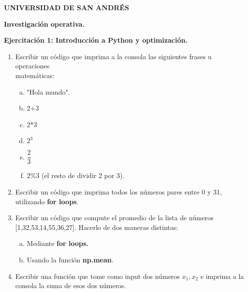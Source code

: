 \documentclass[12pt]{article}
\begin{document}
    \begin{center}
        {\bf UNIVERSIDAD DE SAN ANDR\'ES}
        \medskip
        
        {\bf Investigación operativa.}
        \medskip
        
        {\bf Ejercitaci\'on 1: Introducción a Python y optimización.}
        \medskip


        \begin{enumerate}
            \item Escribir un código que imprima a la consola las siguientes frases u operaciones \\
            matemáticas:
            \begin{enumerate}[a)]
                \item "Hola mundo".
                \item 2+3
                \item 2*3
                \item $2^{3}$
                \item $\dfrac{2}{3}$
                \item $2 \% 3$ (el resto de dividir 2 por 3).
            \end{enumerate}

            \item Escribir un código que imprima todos los números pares entre 0 y 31, utilizando \textbf{for loops}.

            \item Escribir un código que compute el promedio de la lista de números [1,32,53,14,55,36,27].
            Hacerlo de dos maneras distintas:
            \begin{enumerate}[a)]
                \item Mediante \textbf{for loops.}
                \item Usando la función \textbf{np.mean}.
            \end{enumerate}

            \item Escribir una función que tome como input dos números $x_{1},x_{2}$ e imprima a la consola la
            suma de esos dos números.


\end{enumerate}
\end{center}
\end{document}

